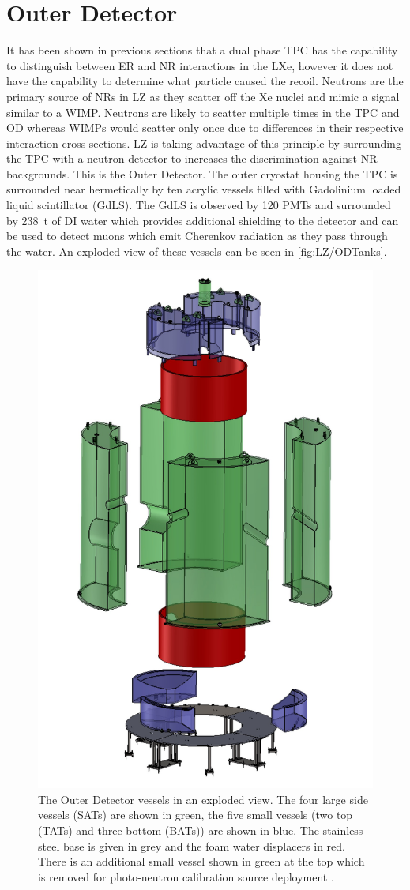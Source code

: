 \section{Outer Detector}\label{sec:LZ/LZOD}
It has been shown in previous sections that a dual phase TPC has the capability to distinguish between ER and NR interactions in the LXe, however it does not have the capability to determine what particle caused the recoil. Neutrons are the primary source of NRs in LZ as they scatter off the Xe nuclei and mimic a signal similar to a WIMP. Neutrons are likely to scatter multiple times in the TPC and OD whereas WIMPs would scatter only once due to differences in their respective interaction cross sections. LZ is taking advantage of this principle by surrounding the TPC with a neutron detector to increases the discrimination against NR backgrounds. This is the Outer Detector.
The outer cryostat housing the TPC is surrounded near hermetically by ten acrylic vessels filled with  Gadolinium loaded liquid scintillator (GdLS). The GdLS is observed by 120 PMTs and surrounded by 238~t of DI water which provides additional shielding to the detector and can be used to detect muons which emit Cherenkov radiation as they pass through the water. An exploded view of these vessels can be seen in \autoref{fig:LZ/ODTanks}.
\begin{figure}[!ht]
    \centering
    \includegraphics[width=0.5\linewidth]{figures/LZ/CAD_ODTanks.jpg}
    \caption[The LZ Outer Detector vessels in an exploded view.]{The Outer Detector vessels in an exploded view. The four large side vessels (SATs) are shown in green, the five small vessels (two top (TATs) and three bottom (BATs)) are shown in blue. The stainless steel base is given in grey and the foam water displacers in red. There is an additional small vessel shown in green at the top which is removed for photo-neutron calibration source deployment \cite{LZNIMA}.}
    \label{fig:LZ/ODTanks}
\end{figure}

